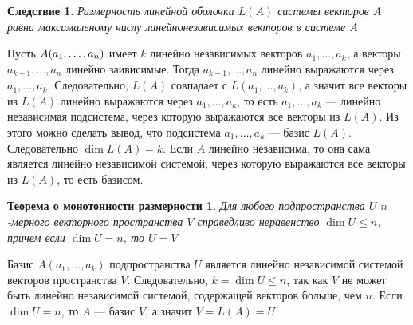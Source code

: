 \newtheorem*{cor5_3}{Следствие}\begin{cor5_3}Размерность линейной оболочки $L
	(A)$ системы векторов $A$ равна максимальному числу линейнонезависимых векторов в системе $A$\end{cor5_3}
\begin{Proof}
	Пусть $A(a_1,\dots,a_n)$ имеет $k$ линейно независимых векторов $a_1,\dots,a_k$, а векторы $a_{k+1},\dots,a_n$ линейно заивисимые. Тогда $a_{k+1},\dots,a_n$ линейно выражаются через $a_1,\dots,a_k$. Следовательно, $L(A)$ совпадает с $L(a_1,\dots,a_k)$, а значит все векторы из $L(A)$ линейно выражаются через $a_1,\dots,a_k$, то есть $a_1,\dots,a_k$ --- линейно независимая подсистема, через которую выражаются все векторы из $L(A)$. Из этого можно сделать вывод, что подсистема $a_1,\dots,a_k$ --- базис $L(A)$. Следовательно $\dim L(A) = k$. Если $A$ линейно независима, то она сама является линейно независимой системой, через которую выражаются все векторы из $L(A)$, то есть базисом.
\end{Proof}
\newtheorem*{th5_2}{Теорема о монотонности размерности}\begin{th5_2}Для любого подпространства $U$ $n$-мерного векторного пространства $V$ справедливо неравенство $\dim U\leqslant n$, причем если $\dim U = n$, то $U=V$ \end{th5_2}
\begin{Proof}
	Базис $A(a_1,\dots,a_k)$ подпространства $U$ является линейно независимой системой векторов пространства $V$. Следовательно, $k = \dim  U \leqslant n$, так как $V$ не может быть линейно независимой системой, содержащей векторов больше, чем $n$. Если $\dim  U = n$, то $A$ --- базис $V$, а значит $V = L(A) = U$
\end{Proof}













